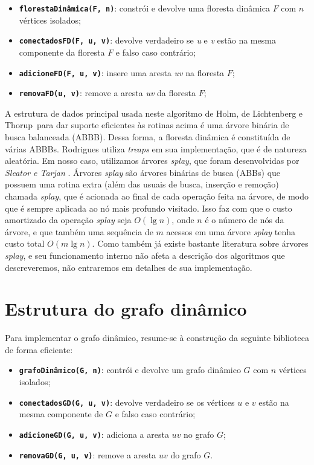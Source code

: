 \begin{itemize}
    \item \texttt{\textbf{florestaDinâmica(F, n)}}: constrói e devolve uma floresta dinâmica $F$ com $n$ vértices isolados;
    \item \texttt{\textbf{conectadosFD(F, u, v)}}: devolve verdadeiro se \textit{u} e \textit{v} estão na mesma componente da floresta $F$ e falso caso contrário;
    \item \texttt{\textbf{adicioneFD(F, u, v)}}: insere uma aresta \textit{uv} na floresta $F$;
    \item \texttt{\textbf{removaFD(u, v)}}: remove a aresta \textit{uv} da floresta $F$;
\end{itemize}

A estrutura de dados principal usada neste algoritmo de Holm, de Lichtenberg e Thorup~para dar suporte eficientes às rotinas acima é uma árvore binária de busca balanceada (ABBB). Dessa forma, a floresta dinâmica é constituída de várias ABBBs. Rodrigues utiliza \textit{treaps} em sua implementação, que é de natureza aleatória. Em nosso caso, utilizamos árvores \textit{splay}, que foram desenvolvidas por \textit{Sleator e Tarjan} \cite{sleator}. Árvores \textit{splay} são árvores binárias de busca (ABBs) que possuem uma rotina extra (além das usuais de busca, inserção e remoção) chamada \textit{splay}, que é acionada ao final de cada operação feita na árvore, de modo que é sempre aplicada ao nó mais profundo visitado. Isso faz com que o custo amortizado da operação \textit{splay} seja $O(\lg n)$, onde $n$ é o número de nós da árvore, e que também uma sequência de $m$ acessos em uma árvore \textit{splay} tenha custo total $O(m \lg n)$.  Como também já existe bastante literatura sobre árvores \textit{splay}, e seu funcionamento interno não afeta a descrição dos algoritmos que descreveremos, não entraremos em detalhes de sua implementação.

\section{Estrutura do grafo dinâmico}
\label{sec:dynamic-graph-structure}

Para implementar o grafo dinâmico, resume-se à construção da seguinte biblioteca de forma eficiente:

\begin{itemize}
    \item \texttt{\textbf{grafoDinâmico(G, n)}}: contrói e devolve um grafo dinâmico $G$ com $n$ vértices isolados;
    \item \texttt{\textbf{conectadosGD(G, u, v)}}: devolve verdadeiro se os vértices $u$ e $v$ estão na mesma componente de $G$ e falso caso contrário;
    \item \texttt{\textbf{adicioneGD(G, u, v)}}: adiciona a aresta $uv$ no grafo $G$;
    \item \texttt{\textbf{removaGD(G, u, v)}}: remove a aresta $uv$ do grafo $G$.
\end{itemize} 

